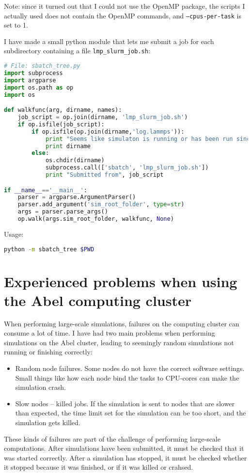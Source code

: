 Note: since it turned out that I could not use the OpenMP package, the scripts I actually used does not contain the OpenMP commands, and {\tt --cpus-per-task} is set to 1.

I have made a small python module that lets me submit a job for each subdirectory containing a file {\tt lmp\_slurm\_job.sh}:

\begin{lstlisting}[language=Python]
# File: sbatch_tree.py
import subprocess
import argparse
import os.path as op
import os

def walkfunc(arg, dirname, names):
	job_script = op.join(dirname, 'lmp_slurm_job.sh')
	if op.isfile(job_script):
		if op.isfile(op.join(dirname,'log.lammps')):
			print "Seems like simulaton is running or has been run since there are output files in the folder"
			print dirname
		else:
			os.chdir(dirname)
			subprocess.call(['sbatch', 'lmp_slurm_job.sh'])
			print "Submitted from", job_script 

if __name__=='__main__':
	parser = argparse.ArgumentParser()
	parser.add_argument('sim_root_folder', type=str)
	args = parser.parse_args()
	op.walk(args.sim_root_folder, walkfunc, None)
\end{lstlisting}

Usage:
\begin{lstlisting}[language=Bash]
python -m sbatch_tree $PWD
\end{lstlisting}

\section{Experienced problems when using the Abel computing cluster}
When performing large-scale simulations, failures on the computing cluster can consume a lot of time. I have had two main problems when performing simulations on the Abel cluster, leading to seemingly random simulations not running or finishing correctly:
\begin{itemize}
\item Random node failures. Some nodes do not have the correct software settings. Small things like how each node bind the tasks to CPU-cores can make the simulation crash.
\item Slow nodes -- killed jobs. If the simulation is sent to nodes that are slower than expected, the time limit set for the simulation can be too short, and the simulation gets killed.
\end{itemize}
These kinds of failures are part of the challenge of performing large-scale computations. After simulations have been submitted, it must be checked that it was started correctly. After a simulation has stopped, it must be checked whether it stopped because it was finished, or if it was killed or crahsed.